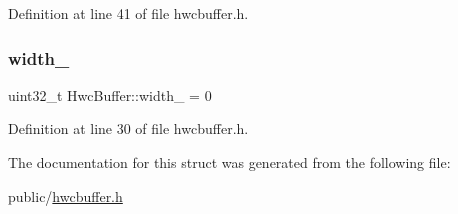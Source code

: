 Definition at line 41 of file hwcbuffer.\+h.

\mbox{\label{structHwcBuffer_a30619ecf0d453e5f26717b4faa62a0ef}} 
\subsubsection{\texorpdfstring{width\+\_\+}{width\_}}
{\footnotesize\ttfamily uint32\+\_\+t Hwc\+Buffer\+::width\+\_\+ = 0}



Definition at line 30 of file hwcbuffer.\+h.



The documentation for this struct was generated from the following file\+:\begin{DoxyCompactItemize}
\item 
public/\mbox{\hyperlink{hwcbuffer_8h}{hwcbuffer.\+h}}\end{DoxyCompactItemize}
